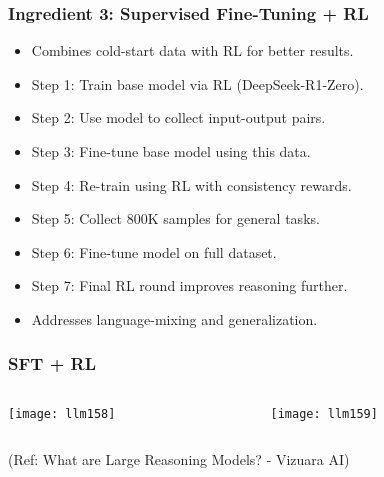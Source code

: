 \begin{frame}[fragile]\frametitle{Ingredient 3: Supervised Fine-Tuning + RL}
\begin{itemize}
  \item Combines cold-start data with RL for better results.
  \item Step 1: Train base model via RL (DeepSeek-R1-Zero).
  \item Step 2: Use model to collect input-output pairs.
  \item Step 3: Fine-tune base model using this data.
  \item Step 4: Re-train using RL with consistency rewards.
  \item Step 5: Collect 800K samples for general tasks.
  \item Step 6: Fine-tune model on full dataset.
  \item Step 7: Final RL round improves reasoning further.
  \item Addresses language-mixing and generalization.
\end{itemize}
\end{frame}

\begin{frame}[fragile]\frametitle{SFT + RL}


\begin{columns}
    \begin{column}[T]{0.5\linewidth}
		\begin{center}
		\texttt{[image: llm158]}
		\end{center}

    \end{column}
    \begin{column}[T]{0.5\linewidth}
		\begin{center}
		\texttt{[image: llm159]}
		\end{center}
    \end{column}
  \end{columns}
  

{\tiny (Ref: What are Large Reasoning Models? - Vizuara AI)}

\end{frame}

